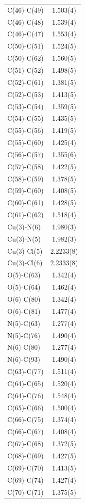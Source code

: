 \begin{center}
{\begin{supertabular}{p{1.5in}c}
C(46)-C(49) &1.503(4)\\
C(46)-C(48) &1.539(4)\\
C(46)-C(47) &1.553(4)\\
C(50)-C(51) &1.524(5)\\
C(50)-C(62) &1.560(5)\\
C(51)-C(52) &1.498(5)\\
C(52)-C(61) &1.381(5)\\
C(52)-C(53) &1.413(5)\\
C(53)-C(54) &1.359(5)\\
C(54)-C(55) &1.435(5)\\
C(55)-C(56) &1.419(5)\\
C(55)-C(60) &1.425(4)\\
C(56)-C(57) &1.355(6)\\
C(57)-C(58) &1.422(5)\\
C(58)-C(59) &1.378(5)\\
C(59)-C(60) &1.408(5)\\
C(60)-C(61) &1.428(5)\\
C(61)-C(62) &1.518(4)\\
Cu(3)-N(6) &1.980(3)\\
Cu(3)-N(5) &1.982(3)\\
Cu(3)-Cl(5) &2.2233(8)\\
Cu(3)-Cl(6) &2.2333(8)\\
O(5)-C(63) &1.342(4)\\
O(5)-C(64) &1.462(4)\\
O(6)-C(80) &1.342(4)\\
O(6)-C(81) &1.477(4)\\
N(5)-C(63) &1.277(4)\\
N(5)-C(76) &1.490(4)\\
N(6)-C(80) &1.277(4)\\
N(6)-C(93) &1.490(4)\\
C(63)-C(77) &1.511(4)\\
C(64)-C(65) &1.520(4)\\
C(64)-C(76) &1.548(4)\\
C(65)-C(66) &1.500(4)\\
C(66)-C(75) &1.374(4)\\
C(66)-C(67) &1.408(4)\\
C(67)-C(68) &1.372(5)\\
C(68)-C(69) &1.427(5)\\
C(69)-C(70) &1.413(5)\\
C(69)-C(74) &1.427(4)\\
C(70)-C(71) &1.375(5)\\

\end{supertabular}}
\end{center}

